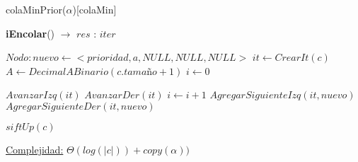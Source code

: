 \begin{Estructura}{colaMinPrior($\alpha$)}[colaMin]
\begin{algorithm}[H]{\textbf{iEncolar}()  $\to$ $res$ : $iter$ }
    	\begin{algorithmic}[1]
			\State $Nodo: nuevo \leftarrow <prioridad, a, NULL, NULL, NULL> $ 				
			\State $it \leftarrow CrearIt(c)$ 
			\State $A \leftarrow DecimalABinario(c.tamaño + 1) $ 			
			\State $i \leftarrow 0$ 
									
			 			
				 
					\State $AvanzarIzq(it) $ 
				\Else
					\State $AvanzarDer(it) $ 
				\EndIf			
				\State $i \leftarrow i + 1$ 
			\EndWhile
			 
				\State $AgregarSiguienteIzq(it, nuevo)$ 
			\Else
				\State $AgregarSiguienteDer(it, nuevo)$ 
			\EndIf			

			\State $siftUp(c) $ 

			\medskip
			\Statex \underline{Complejidad:} $\Theta(log(|c|)) + copy(\alpha))$
    	\end{algorithmic}
\end{algorithm}
    	

\end{Estructura}
